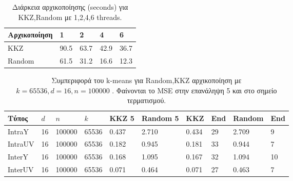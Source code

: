 \begin{table}[h!]
    \begin{center}
        \begin{tabular}{| l | l | l | l | l |}
        \hline
        Αρχικοποίηση   & 1     & 2      & 4     & 6        \\ \hline
        KKZ            & 90.5  & 63.7   & 42.9  & 36.7     \\ \hline
        Random         & 61.5  & 31.2  & 16.6 & 12.3    \\ \hline
        \hline
        \end{tabular}
    \end{center}
    \caption{Διάρκεια αρχικοποίησης (seconds) για KKZ,Random με 1,2,4,6 threads.}
    \label{table:kkzspeed}
\end{table}

\begin{table}[h!]
    \begin{center}
        \begin{tabular}{| l | l | l | l | l | l || l | l || l | l ||}
        \hline
        Τύπος    & $d$  & $n$      & $k$   & KKZ 5  & Random 5 &  KKZ   & End   & Random & End    \\ \hline
        IntraY   & 16   & 100000   & 65536 & 0.437  & 2.710    &  0.434 & 29    & 2.709  & 9                 \\ \hline
        IntraUV  & 16   & 100000   & 65536 & 0.182  & 0.945    &  0.181 & 33    & 0.944  & 7                 \\ \hline
        InterY   & 16   & 100000   & 65536 & 0.168  & 1.095    &  0.167 & 32    & 1.094  & 10                \\ \hline
        InterUV  & 16   & 100000   & 65536 & 0.071  & 0.464    &  0.071 & 27    & 0.463  & 7                 \\ \hline
        \hline
        \end{tabular}
    \end{center}
    \caption{Συμπεριφορά του k-means για Random,KKZ αρχικοποίηση με $k=65536,d=16,n=100000$
    . Φαίνονται το MSE στην επανάληψη 5 και στο σημείο τερματισμού.}
    \label{table:kkziter}
\end{table}

